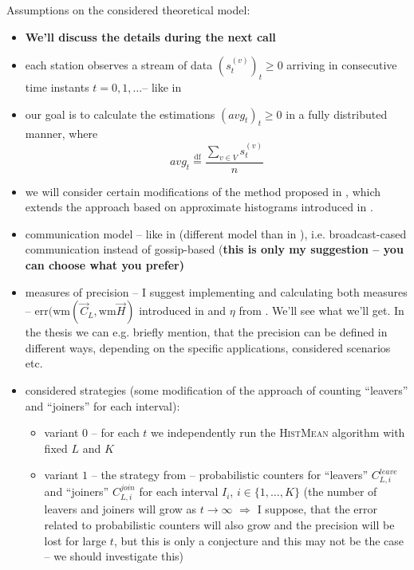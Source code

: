 \documentclass[a4paper, 12pt]{article}
\begin{document}
Assumptions on the considered theoretical model: 
\begin{itemize}
	\item \textbf{We'll discuss the details during the next call}
	\item each station observes a stream of data $(s^{(v)}_t)_t \geq 0$ arriving in consecutive time instants $t = 0, 1, \dotsc$-- like in \cite{Nugroho:2020:AveragingTS}
	\item our goal is to calculate the estimations $(avg_t)_t\geq 0$ in a fully distributed manner, where
		\[
			avg_t \stackrel{\text{df}}{=} \frac {\sum_{v \in V} s^{(v)}_t}{n}
		\]
	\item we will consider certain modifications of the method proposed in \cite{Nugroho:2020:AveragingTS}, which extends the approach based on approximate histograms
		introduced in \cite{JCi:2018:Histograms}.
	\item communication model -- like in \cite{JCi:2018:Histograms} (different model than in \cite{Nugroho:2020:AveragingTS}), i.e. broadcast-cased communication instead of gossip-based
		(\textbf{this is only my suggestion -- you can choose what you prefer)}
	\item measures of precision -- I suggest implementing and calculating both measures --  $\text{err}(\text{wm}(\vec{C}_L,\text{wm}\vec{H})$ introduced in \cite{JCi:2018:Histograms}
		and $\eta$ from \cite{Nugroho:2020:AveragingTS}. We'll see what we'll get. In the thesis we can e.g. briefly mention, that the precision can be defined in different ways, 
		depending on the specific applications, considered scenarios etc.
	\item considered strategies (some modification of the approach of counting ``leavers'' and ``joiners'' for each interval):
		\begin{itemize}
			\item variant $0$ -- for each $t$ we independently run the \textsc{HistMean} algorithm with fixed $L$ and $K$
			\item variant $1$ -- the strategy from \cite{Nugroho:2020:AveragingTS} -- probabilistic counters for ``leavers'' $C^{leave}_{L,i}$ and ``joiners'' $C^{join}_{L,i}$
				for each interval $I_i$, $i \in \{1, \dotsc, K\}$  (the number of leavers and joiners will grow as
				$t \to \infty$ $\Rightarrow$ I suppose, that the error related to probabilistic counters will also grow and the precision will be lost for large $t$,
				but this is only a conjecture and this may not be the case -- we should investigate this)\\

\end{itemize}
\end{itemize}
\end{document}
